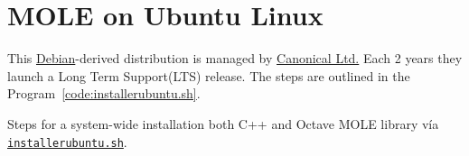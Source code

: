 \section{MOLE on Ubuntu Linux}

This \href{https://www.debian.org}{Debian}-derived distribution is
managed by \href{https://canonical.com}{Canonical Ltd.}
Each 2 years they launch a Long Term Support(LTS) release.
The steps are outlined in the Program~\ref{code:installerubuntu.sh}.

\begin{listing}[ht!]
	\tiny
	\centering
	\caption{Steps for a system-wide installation both C++ and Octave
		MOLE library vía \href{https://raw.githubusercontent.com/carlosal1015/mole_examples/main/tutorial/installerubuntu.sh}{\texttt{installerubuntu.sh}}.}
	\label{code:installerubuntu.sh}
\end{listing}
